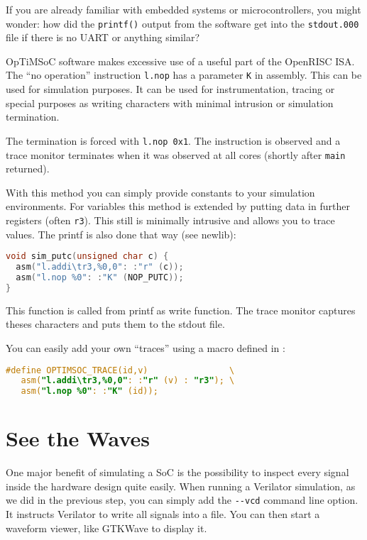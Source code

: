 \begin{docnote}
If you are already familiar with embedded systems or microcontrollers, you might wonder:
how did the \verb|printf()| output from the software get into the \verb|stdout.000| file if there is no UART or anything similar?

OpTiMSoC software makes excessive use of a useful part of the OpenRISC ISA. The
``no operation'' instruction \verb|l.nop| has a parameter \verb|K| in assembly.
This can be used for simulation purposes. It can be used for instrumentation,
tracing or special purposes as writing characters with minimal intrusion or
simulation termination.

The termination is forced with \verb|l.nop 0x1|. The instruction is
observed and a trace monitor terminates when it was observed at all
cores (shortly after \verb|main| returned).

With this method you can simply provide constants to your simulation
environments. For variables this method is extended by putting data in
further registers (often \verb|r3|). This still is minimally intrusive
and allows you to trace values. The printf is also done that way (see
newlib):

\begin{lstlisting}[language=C]
void sim_putc(unsigned char c) {
  asm("l.addi\tr3,%0,0": :"r" (c));
  asm("l.nop %0": :"K" (NOP_PUTC));
}
\end{lstlisting}

This function is called from printf as write function. The trace
monitor captures theses characters and puts them to the stdout file.

You can easily add your own ``traces'' using a macro defined in
:

\begin{lstlisting}[language=C]
#define OPTIMSOC_TRACE(id,v)                \
   asm("l.addi\tr3,%0,0": :"r" (v) : "r3"); \
   asm("l.nop %0": :"K" (id));
\end{lstlisting}
\end{docnote}

\section{See the Waves}

One major benefit of simulating a SoC is the possibility to inspect every signal inside the hardware design quite easily.
When running a Verilator simulation, as we did in the previous step, you can simply add the \verb|--vcd| command line option.
It instructs Verilator to write all signals into a file.
You can then start a waveform viewer, like GTKWave to display it.

